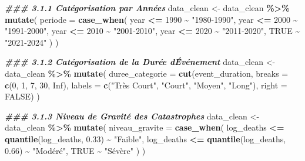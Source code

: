 \documentclass[
]{article}
\newenvironment{Shaded}{\begin{snugshade}}{\end{snugshade}}
\newcommand{\AttributeTok}[1]{\textcolor[rgb]{0.13,0.29,0.53}{#1}}
\newcommand{\ConstantTok}[1]{\textcolor[rgb]{0.56,0.35,0.01}{#1}}
\newcommand{\DecValTok}[1]{\textcolor[rgb]{0.00,0.00,0.81}{#1}}
\newcommand{\DocumentationTok}[1]{\textcolor[rgb]{0.56,0.35,0.01}{\textbf{\textit{#1}}}}
\newcommand{\FloatTok}[1]{\textcolor[rgb]{0.00,0.00,0.81}{#1}}
\newcommand{\FunctionTok}[1]{\textcolor[rgb]{0.13,0.29,0.53}{\textbf{#1}}}
\newcommand{\NormalTok}[1]{#1}
\newcommand{\OtherTok}[1]{\textcolor[rgb]{0.56,0.35,0.01}{#1}}
\newcommand{\SpecialCharTok}[1]{\textcolor[rgb]{0.81,0.36,0.00}{\textbf{#1}}}
\newcommand{\StringTok}[1]{\textcolor[rgb]{0.31,0.60,0.02}{#1}}
\begin{document}
\begin{Shaded}
\begin{Highlighting}[]
\DocumentationTok{\#\#\# 3.1.1 Catégorisation par Années}
\NormalTok{data\_clean }\OtherTok{\textless{}{-}}\NormalTok{ data\_clean }\SpecialCharTok{\%\textgreater{}\%}
  \FunctionTok{mutate}\NormalTok{(}
    \AttributeTok{periode =} \FunctionTok{case\_when}\NormalTok{(}
\NormalTok{      year }\SpecialCharTok{\textless{}=} \DecValTok{1990} \SpecialCharTok{\textasciitilde{}} \StringTok{"1980{-}1990"}\NormalTok{,}
\NormalTok{      year }\SpecialCharTok{\textless{}=} \DecValTok{2000} \SpecialCharTok{\textasciitilde{}} \StringTok{"1991{-}2000"}\NormalTok{, }
\NormalTok{      year }\SpecialCharTok{\textless{}=} \DecValTok{2010} \SpecialCharTok{\textasciitilde{}} \StringTok{"2001{-}2010"}\NormalTok{,}
\NormalTok{      year }\SpecialCharTok{\textless{}=} \DecValTok{2020} \SpecialCharTok{\textasciitilde{}} \StringTok{"2011{-}2020"}\NormalTok{,}
      \ConstantTok{TRUE} \SpecialCharTok{\textasciitilde{}} \StringTok{"2021{-}2024"}
\NormalTok{    )}
\NormalTok{  )}

\DocumentationTok{\#\#\# 3.1.2 Catégorisation de la Durée d\textquotesingle{}Événement}
\NormalTok{data\_clean }\OtherTok{\textless{}{-}}\NormalTok{ data\_clean }\SpecialCharTok{\%\textgreater{}\%}
  \FunctionTok{mutate}\NormalTok{(}
    \AttributeTok{duree\_categorie =} \FunctionTok{cut}\NormalTok{(event\_duration, }
                          \AttributeTok{breaks =} \FunctionTok{c}\NormalTok{(}\DecValTok{0}\NormalTok{, }\DecValTok{1}\NormalTok{, }\DecValTok{7}\NormalTok{, }\DecValTok{30}\NormalTok{, }\ConstantTok{Inf}\NormalTok{),}
                          \AttributeTok{labels =} \FunctionTok{c}\NormalTok{(}\StringTok{"Très Court"}\NormalTok{, }\StringTok{"Court"}\NormalTok{, }\StringTok{"Moyen"}\NormalTok{, }\StringTok{"Long"}\NormalTok{),}
                          \AttributeTok{right =} \ConstantTok{FALSE}\NormalTok{)}
\NormalTok{  )}

\DocumentationTok{\#\#\# 3.1.3 Niveau de Gravité des Catastrophes}
\NormalTok{data\_clean }\OtherTok{\textless{}{-}}\NormalTok{ data\_clean }\SpecialCharTok{\%\textgreater{}\%}
  \FunctionTok{mutate}\NormalTok{(}
    \AttributeTok{niveau\_gravite =} \FunctionTok{case\_when}\NormalTok{(}
\NormalTok{      log\_deaths }\SpecialCharTok{\textless{}=} \FunctionTok{quantile}\NormalTok{(log\_deaths, }\FloatTok{0.33}\NormalTok{) }\SpecialCharTok{\textasciitilde{}} \StringTok{"Faible"}\NormalTok{,}
\NormalTok{      log\_deaths }\SpecialCharTok{\textless{}=} \FunctionTok{quantile}\NormalTok{(log\_deaths, }\FloatTok{0.66}\NormalTok{) }\SpecialCharTok{\textasciitilde{}} \StringTok{"Modéré"}\NormalTok{,}
      \ConstantTok{TRUE} \SpecialCharTok{\textasciitilde{}} \StringTok{"Sévère"}
\NormalTok{    )}
\NormalTok{  )}
\end{Highlighting}
\end{Shaded}
\end{document}
